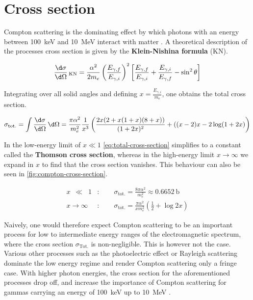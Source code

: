 
\section{Cross section}
\label{sec:compton-cross-section}

Compton scattering is the dominating effect by which photons with an energy between
\SI{100}{\kilo\electronvolt} and \SI{10}{\mega\electronvolt} interact with matter
\cite{damashek1970forward}. A theoretical description of the processes cross section
is given by the \textbf{Klein-Nishina formula} (KN).

\begin{equation}
\label{eq:klein-nishina-cross-section}
\frac{\d\sigma}{\d\Omega}\,_\text{KN} = \frac{\alpha^2}{2m_e}\left(\frac{E_{\gamma,f}}{E_{\gamma,i}}\right)^2\left[\frac{E_{\gamma,f}}{E_{\gamma,i}}+\frac{E_{\gamma,i}}{E_{\gamma,f}}-\sin^2\theta\right]
\end{equation}

Integrating over all solid angles and defining $x=\frac{E_{\gamma,i}}{m_e}$, one
obtains the total cross section.

\begin{equation}
\label{eq:total-cross-section}
\sigma_\text{tot.} = \int \frac{\d\sigma}{\d\Omega}\,\d\Omega = \frac{\pi\alpha^2}{m_e^2}\frac{1}{x^3}\left(\frac{2x(2+x(1+x)(8+x))}{(1+2x)^2} + ((x-2)x-2\log(1+2x)\right)
\end{equation}

In the low-energy limit of $x\ll1$ \autoref{eq:total-cross-section} simplifies to
a constant called the \textbf{Thomson cross section}, whereas in the high-energy
limit $x\rightarrow\infty$ we expand in $x$ to find that the cross section vanishes.
This behaviour can also be seen in \autoref{fig:compton-cross-section}.

\begin{align*}
x\;\:\ll\;\;1&:\qquad\sigma_\text{tot.} = \frac{8\pi\alpha^2}{m_e^2} \approx \SI{0.6652}{\barn}\\
x\longrightarrow\infty&:\qquad\sigma_\text{tot.} = \frac{\pi\alpha^2}{x m_e^2}\left(\frac{1}{2} + \log2x\right)
\end{align*}

Naively, one would therefore expect Compton scattering to be an important process
for low to intermediate energy ranges of the electromagnetic spectrum, where the
cross section $\sigma_\text{Tot.}$ is non-negligible. This is however not the case.
Various other processes such as the photoelectric effect or Rayleigh scattering
dominate the low energy regime and render Compton scattering only a fringe case.
With higher photon energies, the cross section for the aforementioned processes
drop off, and increase the importance of Compton scattering for gammas carrying
an energy of \SI{100}{\kilo\electronvolt} up to \SI{10}{\mega\electronvolt} .
